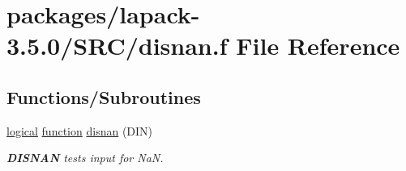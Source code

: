 \hypertarget{disnan_8f}{}\section{packages/lapack-\/3.5.0/\+S\+R\+C/disnan.f File Reference}
\label{disnan_8f}
\subsection*{Functions/\+Subroutines}
\begin{DoxyCompactItemize}
\item 
\hyperlink{tnc_8c_aa7b64cdf39500931f7b333343791a104}{logical} \hyperlink{afunc_8m_a7b5e596df91eadea6c537c0825e894a7}{function} \hyperlink{group__auxOTHERauxiliary_ga230d4e1886896853b11e44e541b2c6a3}{disnan} (D\+I\+N)
\begin{DoxyCompactList}\small\item\em {\bfseries D\+I\+S\+N\+A\+N} tests input for Na\+N. \end{DoxyCompactList}\end{DoxyCompactItemize}
